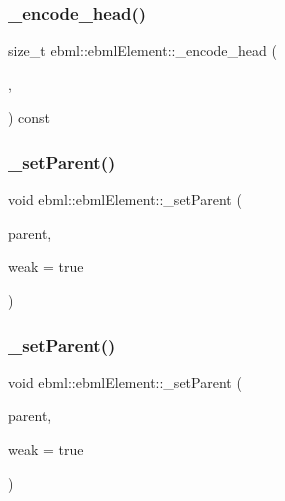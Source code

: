 \subsubsection{\texorpdfstring{\+\_\+encode\+\_\+head()}{\_encode\_head()}}
{\footnotesize\ttfamily size\+\_\+t ebml\+::ebml\+Element\+::\+\_\+encode\+\_\+head (\begin{DoxyParamCaption}\item[{char $\ast$}]{,  }\item[{size\+\_\+t}]{ }\end{DoxyParamCaption}) const\hspace{0.3cm}{\ttfamily [protected]}}

\mbox{\label{classebml_1_1ebmlElement_adb339374049c8687265a32a38be45254}} 
\subsubsection{\texorpdfstring{\+\_\+set\+Parent()}{\_setParent()}\hspace{0.1cm}{\footnotesize\ttfamily [1/4]}}
{\footnotesize\ttfamily void ebml\+::ebml\+Element\+::\+\_\+set\+Parent (\begin{DoxyParamCaption}\item[{const \mbox{\hyperlink{namespaceebml_adad533b7705a16bb360fe56380c5e7be}{ebml\+Element\+\_\+sp}} \&}]{parent,  }\item[{bool}]{weak = {\ttfamily true} }\end{DoxyParamCaption})\hspace{0.3cm}{\ttfamily [protected]}}

\mbox{\label{classebml_1_1ebmlElement_a0bf0180b2d3db0849adb14948a1fb6cb}} 
\subsubsection{\texorpdfstring{\+\_\+set\+Parent()}{\_setParent()}\hspace{0.1cm}{\footnotesize\ttfamily [2/4]}}
{\footnotesize\ttfamily void ebml\+::ebml\+Element\+::\+\_\+set\+Parent (\begin{DoxyParamCaption}\item[{const \mbox{\hyperlink{namespaceebml_a2deef4e8071531b32e3533f1bf978917}{c\+\_\+ebml\+Element\+\_\+sp}} \&}]{parent,  }\item[{bool}]{weak = {\ttfamily true} }\end{DoxyParamCaption})\hspace{0.3cm}{\ttfamily [protected]}}


